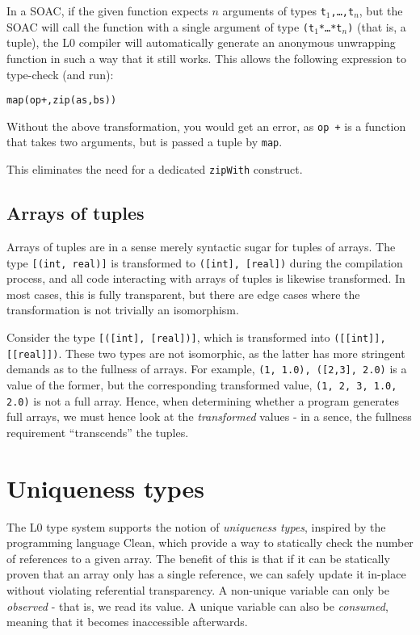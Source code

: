\documentclass[oneside]{memoir}
\begin{document}
In a SOAC, if the given function expects $n$ arguments of types
\texttt{t$_{1}$,\ldots,{}t$_{n}$}, but the SOAC will call the function
with a single argument of type \texttt{(t$_{1}$*\ldots{}*t$_{n}$)}
(that is, a tuple), the L0 compiler will automatically generate an
anonymous unwrapping function in such a way that it still works.  This
allows the following expression to type-check (and run):

\begin{alltt}
  map(op +, zip(as, bs))
\end{alltt}

Without the above transformation, you would get an error, as
\texttt{op +} is a function that takes two arguments, but is passed a
tuple by \texttt{map}.

This eliminates the need for a dedicated \texttt{zipWith} construct.

\subsection{Arrays of tuples}

Arrays of tuples are in a sense merely syntactic sugar for tuples of
arrays.  The type \texttt{[(int, real)]} is transformed to
\texttt{([int], [real])} during the compilation process, and all code
interacting with arrays of tuples is likewise transformed.  In most
cases, this is fully transparent, but there are edge cases where the
transformation is not trivially an isomorphism.

Consider the type \texttt{[([int], [real])]}, which is transformed
into \texttt{([[int]], [[real]])}.  These two types are not
isomorphic, as the latter has more stringent demands as to the
fullness of arrays.  For example, \texttt{{({1}, {1.0}), ([2,3],
    {2.0})}} is a value of the former, but the corresponding
transformed value, \texttt{({{1}, {2, 3}}, {{1.0}, {2.0}})} is not a
full array.  Hence, when determining whether a program generates full
arrays, we must hence look at the \textit{transformed} values - in a
sence, the fullness requirement ``transcends'' the tuples.

\section{Uniqueness types}
\label{sec:l0-uniqueness-types}

The L0 type system supports the notion of \emph{uniqueness types},
inspired by the programming language Clean, which provide a way to
statically check the number of references to a given array.  The
benefit of this is that if it can be statically proven that an array
only has a single reference, we can safely update it in-place without
violating referential transparency.  A non-unique variable can only be
\textit{observed} - that is, we read its value.  A unique variable can
also be \textit{consumed}, meaning that it becomes inaccessible
afterwards.
\end{document}
